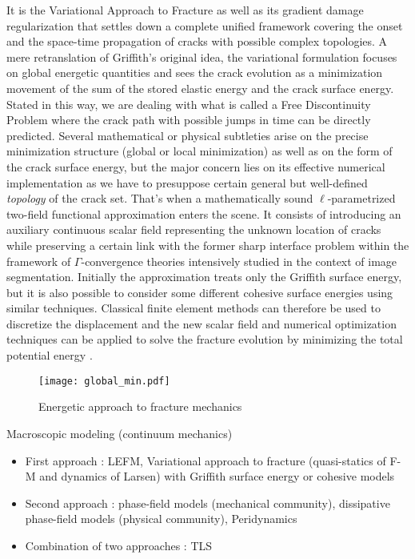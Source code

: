 It is the Variational Approach to Fracture as well as its gradient damage regularization \cite{BourdinFrancfortMarigo:2008} that settles down a complete unified framework covering the onset and the space-time propagation of cracks with possible complex topologies. A mere retranslation of Griffith's original idea, the variational formulation focuses on global energetic quantities and sees the crack evolution as a minimization movement of the sum of the stored elastic energy and the crack surface energy. Stated in this way, we are dealing with what is called a Free Discontinuity Problem where the crack path with possible jumps in time can be directly predicted. Several mathematical or physical subtleties arise on the precise minimization structure (global or local minimization) as well as on the form of the crack surface energy, but the major concern lies on its effective numerical implementation as we have to presuppose certain general but well-defined \emph{topology} of the crack set. That's when a mathematically sound $\ell$-parametrized two-field functional approximation \cite{BourdinFrancfortMarigo:2000} enters the scene. It consists of introducing an auxiliary continuous scalar field representing the unknown location of cracks while preserving a certain link with the former sharp interface problem within the framework of $\Gamma$-convergence theories intensively studied in the context of image segmentation. Initially the approximation treats only the Griffith surface energy, but it is also possible \cite{ContiFocardiIurlano:2015} to consider some different cohesive surface energies using similar techniques. Classical finite element methods can therefore be used to discretize the displacement and the new scalar field and numerical optimization techniques can be applied to solve the fracture evolution by minimizing the total potential energy \cite{PieroLancioniMarch:2007,MauriniBourdinGauthierLazarus:2013,HossainHsuehBourdinBhattachary:2014,MesgarnejadBourdinKhonsari:2014}.
\begin{figure}[htbp]
\centering
\texttt{[image: global\_min.pdf]}
\caption{Energetic approach to fracture mechanics} \label{fig:globalmin}
\end{figure}

Macroscopic modeling (continuum mechanics)
\begin{itemize}
\item First approach : LEFM, Variational approach to fracture (quasi-statics of F-M and dynamics of Larsen) with Griffith surface energy or cohesive models
\item Second approach : phase-field models (mechanical community), dissipative phase-field models (physical community), Peridynamics
\item Combination of two approaches : TLS
\end{itemize}

